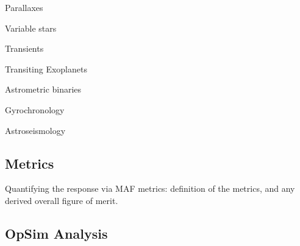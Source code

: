 \item Parallaxes

\item Variable stars

  
\item Transients 

\item Transiting Exoplanets

\item Astrometric binaries

\item Gyrochronology

\item Astroseismology




\subsection{Metrics}
\label{sec:keyword:metrics}

Quantifying the response via MAF metrics: definition of the metrics,
and any derived overall figure of merit.



\subsection{OpSim Analysis}
\label{sec:keyword:analysis}

